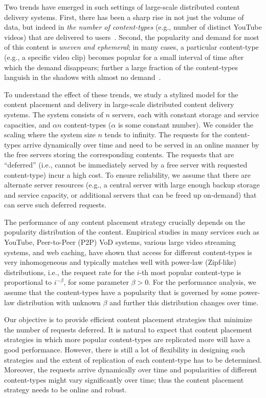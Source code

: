\documentclass[10pt, conference, letterpaper]{IEEEtran}
\begin{document}
Two trends have emerged in such settings of large-scale distributed
content delivery systems. First, there has been a sharp rise in not
just the volume of data, but indeed in \textit{the number
	of content-types} (e.g., number of distinct YouTube videos) that are
delivered to users~\cite{Youtube}. Second, the popularity and demand
for most of this content is \textit{uneven and ephemeral}; in many
cases, a particular content-type (e.g., a specific video clip) becomes
popular for a small interval of time after which the demand
disappears; further a large fraction of the content-types languish in
the shadows with almost no demand~\cite{Gill07,temporal13}.

To understand the effect of these trends, we study a stylized model
for the content placement and delivery in large-scale distributed
content delivery systems. The system consists of $n$ servers, each
with constant storage and service capacities, and $\alpha n$
content-types ($\alpha$ is some constant number). We consider the
scaling where the system size $n$ tends to infinity. The requests for
the content-types arrive dynamically over time and need to be served
in an online manner by the free servers storing the corresponding
contents. The requests that are ``deferred'' (i.e., cannot be
immediately served by a free server with requested content-type) incur
a high cost. To ensure reliability, we assume that there are
alternate server resources (e.g., a central server with large enough
backup storage and service capacity, or additional servers that can be
freed up on-demand) that can serve such deferred requests.

The performance of any content placement strategy crucially depends on
the popularity distribution of the content. Empirical studies in many
services such as YouTube, Peer-to-Peer (P2P) VoD systems, various
large video streaming systems, and web caching,
\cite{Gill07,BC99,YZ06,IRF04,VA02} have shown that access for
different content-types is very inhomogeneous and typically matches
well with power-law (Zipf-like) distributions, i.e., the request rate
for the $i$-th most popular content-type is proportional to $i^{-\beta}$,
for some parameter $\beta>0$.  For the performance analysis, we assume
that the content-types have a popularity that is governed by some
power-law distribution with unknown $\beta$ and further this
distribution changes over time.

Our objective is to provide efficient content placement strategies
that minimize the number of requests deferred. It is natural to expect
that content placement strategies in which more popular content-types
are replicated more will have a good performance. However, there is
still a lot of flexibility in designing such strategies and the extent
of replication of each content-type has to be determined.  Moreover, the
requests arrive dynamically over time and popularities of different
content-types might vary significantly over time; thus the content
placement strategy needs to be online and robust.
\end{document}
